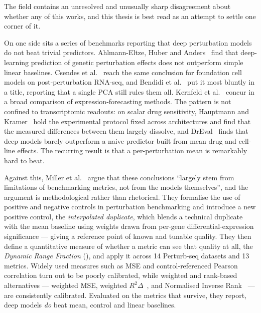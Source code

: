 The field contains an unresolved and unusually sharp disagreement about whether any of this works,
and this thesis is best read as an attempt to settle one corner of it.

On one side sits a series of benchmarks reporting that deep perturbation models do not beat trivial
predictors. Ahlmann-Eltze, Huber and Anders~\cite{ahlmanneltze} find that deep-learning prediction of
genetic perturbation effects does not outperform simple linear baselines. Csendes et
al.~\cite{csendes} reach the same conclusion for foundation cell models on post-perturbation
RNA-seq, and Bendidi et al.~\cite{bendidi} put it most bluntly in a title, reporting that a single
PCA still rules them all. Kernfeld et al.~\cite{kernfeld} concur in a broad comparison of
expression-forecasting methods. The pattern is not confined to transcriptomic readouts: on scalar
drug sensitivity, Hauptmann and Kramer~\cite{hauptmann} hold the experimental protocol fixed across
architectures and find that the measured differences between them largely dissolve, and
DrEval~\cite{dreval} finds that deep models barely outperform a naive predictor built from mean drug
and cell-line effects. The recurring result is that a per-perturbation mean is remarkably hard to
beat.

Against this, Miller et al.~\cite{miller} argue that these conclusions ``largely stem from
limitations of benchmarking metrics, not from the models themselves'', and the argument is
methodological rather than rhetorical. They formalise the use of positive and negative controls in
perturbation benchmarking and introduce a new positive control, the \emph{interpolated duplicate},
which blends a technical duplicate with the mean baseline using weights drawn from per-gene
differential-expression significance --- giving a reference point of known and tunable quality. They
then define a quantitative measure of whether a metric can see that quality at all, the
\emph{Dynamic Range Fraction} (\DRF), and apply it across 14 Perturb-seq datasets and 13 metrics.
Widely used measures such as MSE and control-referenced Pearson correlation turn out to be poorly
calibrated, while weighted and rank-based alternatives --- weighted MSE, weighted
$R^2\Delta$~\cite{mejia}, and Normalised Inverse Rank~\cite{perturbench} --- are consistently
calibrated. Evaluated on the metrics that survive, they report, deep models \emph{do} beat mean,
control and linear baselines.


